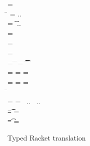 \documentclass{tex/llncs}
\begin{document}
\begin{figure}[!b]
	
	\hrulefill
	
	\medskip
	
	\small
	\begin{minipage}{12cm}  
		\begin{tabbing}
			 =  \\
			\hspace{4.6cm}\= \WHERE\HS 
			\mdp[1] = \src{\Mdef\m\x\t\tp{\ep[1]}} ..\HS\HS \\
			\>\qquad\HS\HS\HS\HS\md[1] = \Mdef\m\x\t\tp{\e[1]} ..\HS\HS \\
			\>\qquad\HS\HS\HS\HS \ep[1] = \TRG{\e[1]}{\x:\t\,\this:\C}
			\\
			\TRG\x\Env = \src{\x}
			\\
			\TRG{\FRead\f}\Env  = \src{\FRead\f}
			\\
			\TRG{\FWrite\f\e}\Env =  \src{\FWrite\f\ep} 
			\>\WHERE\HS
			\= \TypeCk\K{\this}\C \HS\HS
			\=  \ep = \TAG\e\Env\t \HS\HS
			\= \Ftype\f\t\In\App\K\C
			\\
			\TRG{\Call{\e[1]}\m{\e[2]}}\Env = \src{\DynCall{\ep[1]}\m{\ep[2]}}
			\>\WHERE \> \TypeCk{\K,\Env}{\e[1]}\any \HS
			\> \ep[1] = \TRG{\e[1]}\Env \HS
			\> \ep[2] = \TAG{\e[2]}\Env\any
			\\
			\TRG{\Call{\e[1]}\m{\e[2]}}\Env = \src{\KCall{\ep[1]}\m{\ep[2]}{\D[1]}{\D[2]}}
			\>\WHERE \> \TypeCk{\K,\Env}{\e[1]}\C 
			\> \ep[1] = \TRG{\e[1]}\Env\HS\HS
			\> \ep[2] = \TAG{\e[2]}\Env{\D[1]} \HS\HS \\
			\> \> \=  \Mtype\m{\D[1]}{\D[2]}\In\App\K\C 
			\\
			\Env =  
			\>\WHERE \>  \ep[1] = \TAG{\e[1]}\Env{\t[1]} ~..
			\> \HS\HS\HS\HS\HS\HS\HS\HS\HS\HS \Ftype{\f[1]}{\t[1]}\In\App\K\C ~..
			\\
			\TAG\e\Env\t = \src\ep
			\> \WHERE\> \TypeCk{\K,\Env}\e\tp \HS
			\>\HS\HS\HS\HS\HS\HS\HS\HS\HS\HS \EM{\K\vdash \t \Sub \tp}
			\>\ep = \TRG\e\Env
			\\
			\TAG\e\Env\t = \src{\BehCast\t\e}
			\>\WHERE\> \TypeCk{\K,\Env}\e\tp \HS 
			\>\HS\HS\HS\HS\HS\HS\HS\HS\HS\HS  \EM{\K\vdash \t \not \Sub \tp}
			\> \ep = \TRG\e\Env
		\end{tabbing}
	\end{minipage}
	
	\medskip
	
	\hrulefill
	\caption{Typed Racket translation}\label{trtr2}
\end{figure}
\end{document}
